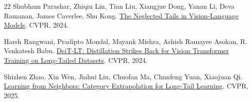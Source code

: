 \documentclass[10pt,twocolumn,letterpaper]{article}
\begin{document}
\begin{thebibliography}{22}
Shubham Parashar, Zhiqiu Lin, Tian Liu, Xiangjue Dong, Yanan Li, Deva Ramanan, James Caverlee, Shu Kong. \href{https://openaccess.thecvf.com/content/CVPR2024/html/Parashar_The_Neglected_Tails_in_Vision-Language_Models_CVPR_2024_paper.html}{The Neglected Tails in Vision-Language Models}. CVPR, 2024.

Harsh Rangwani, Pradipto Mondal, Mayank Mishra, Ashish Ramayee Asokan, R. Venkatesh Babu. \href{https://openaccess.thecvf.com/content/CVPR2024/html/Rangwani_DeiT-LT_Distillation_Strikes_Back_for_Vision_Transformer_Training_on_Long-Tailed_CVPR_2024_paper.html}{DeiT-LT: Distillation Strikes Back for Vision Transformer Training on Long-Tailed Datasets}. CVPR, 2024.

Shizhen Zhao, Xin Wen, Jiahui Liu, Chuofan Ma, Chunfeng Yuan, Xiaojuan Qi. \href{https://openaccess.thecvf.com/content/CVPR2025/html/Zhao_Learning_from_Neighbors_Category_Extrapolation_for_Long-Tail_Learning_CVPR_2025_paper.html}{Learning from Neighbors: Category Extrapolation for Long-Tail Learning}. CVPR, 2025.

\end{thebibliography}
\end{document}
